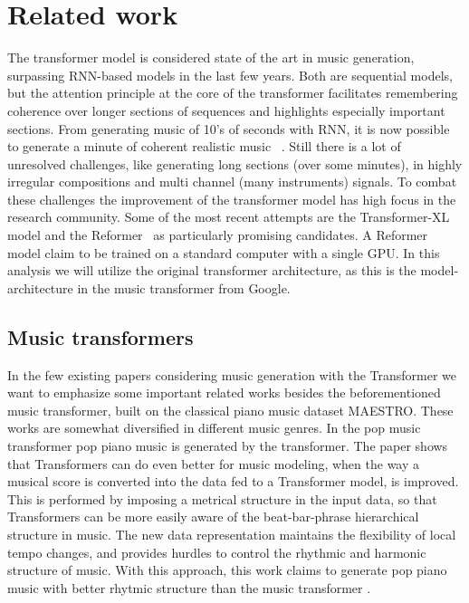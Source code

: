 \documentclass{IEEEtran}
\begin{document}
    \section{Related work}
       The transformer model is considered state of the art in music generation,
       surpassing RNN-based models in the last few years. Both are sequential models,
       but the attention principle at the core of the transformer facilitates
       remembering coherence over longer sections of sequences and highlights
       especially important sections. From generating music of 10's of seconds with RNN, it is now possible to generate a minute of coherent realistic music ~\cite{huang2018music}. Still there is a lot of unresolved challenges, like generating long sections (over some minutes), in highly irregular compositions
       and multi channel (many instruments) signals. To combat these challenges the
       improvement of the transformer model has high focus in the research community.
       Some of the most recent attempts are the Transformer-XL~\cite{dai2019transformerxl} 
       model and the Reformer~\cite{kitaev2020reformer} as particularly promising
       candidates.
       A Reformer model claim to be trained on a standard computer with a single GPU.
       In this analysis we will utilize the original transformer architecture, as this
       is the model-architecture in the music transformer from Google.

       \subsection{Music transformers}
       In the few existing papers considering music generation with the Transformer
       we want to emphasize some important related works besides the beforementioned
       music transformer, built on the classical piano music dataset MAESTRO.
       These works are somewhat diversified in different music genres. In the pop
       music transformer \cite{huang2020pop} pop piano music is generated by the
       transformer. The paper shows that Transformers can do even better for music
       modeling, when the way a musical score is converted into the data fed to a
       Transformer model, is improved. This is performed by imposing a metrical structure
       in the input data, so that Transformers can be more easily aware of the
       beat-bar-phrase hierarchical structure in music. The new data representation
       maintains the flexibility of local tempo changes, and provides hurdles to control
       the rhythmic and harmonic structure of music. With this approach, this work
       claims to generate pop piano music with better rhytmic structure than the music
       transformer \cite{huang2018music}.
\end{document}
